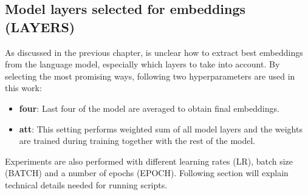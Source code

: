 \subsection{Model layers selected for embeddings (LAYERS)}
As discussed in the previous chapter, is unclear how to extract best embeddings from the language model, especially which layers to take into account. By selecting the most promising ways, following two hyperparameters are used in this work:
\begin{itemize}
\item \textbf{four}: Last four of the model are averaged to obtain final embeddings.
\item \textbf{att}: This setting performs weighted sum of all model layers and the weights are trained during training together with the rest of the model.
\end{itemize}
Experiments are also performed with different learning rates (LR), batch size (BATCH) and a number of epochs (EPOCH). 
Following section will explain technical details needed for running scripts.


